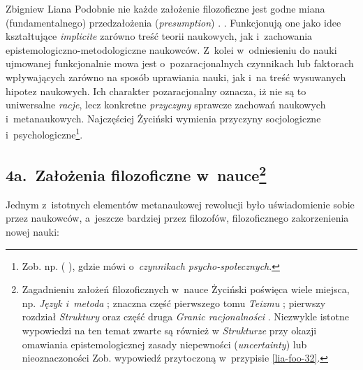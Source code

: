 \begin{artplenv}{Zbigniew Liana}
{%
Podobnie nie każde założenie filozoficzne jest godne miana (fundamentalnego) przedzałożenia
(\textit{presumption})
\parencites[s.~143]{zycinski_structure_1988}[s.~253]{zycinski_struktura_2013}.
}. Funkcjonują one jako idee
kształtujące \textit{implicite} zarówno treść teorii naukowych, jak i~zachowania epistemologiczno-metodologiczne
naukowców. Z~kolei w~odniesieniu do nauki ujmowanej funkcjonalnie mowa jest o~pozaracjonalnych czynnikach lub faktorach
wpływających zarówno na sposób uprawiania nauki, jak i~na treść wysuwanych hipotez naukowych. Ich charakter
pozaracjonalny oznacza, iż nie są to uniwersalne\textit{ racje}, lecz konkretne \textit{przyczyny} sprawcze zachowań
naukowych i~metanaukowych. Najczęściej Życiński wymienia przyczyny socjologiczne i~psychologiczne\footnote{Zob. np. 
(\cites[s.~142nn]{zycinski_jezyk_1983}[s.~9]{zycinski_structure_1988}[s.~17]{zycinski_struktura_2013}
\cite*[a~także][s.~190]{zycinski_elementy_1996}),
gdzie
mówi o~\textit{czynnikach psycho-społecznych}.}.

\subsection{4a.~Założenia filozoficzne w~nauce\footnote{Zagadnieniu założeń filozoficznych w~nauce Życiński poświęca wiele miejsca,
np. \textit{Język i~metoda}
\parencite*[s.~246–261]{zycinski_jezyk_1983};
znaczna część pierwszego tomu
\textit{Teizmu} \parencite[s.~156–232]{zycinski_teizm_1985};
pierwszy rozdział \textit{Struktury} oraz część druga
\textit{Granic racjonalności} \parencite{zycinski_granice_1993}.
Niezwykle istotne wypowiedzi na ten temat zwarte są również w
\textit{Strukturze} przy okazji omawiania epistemologicznej zasady niepewności (\textit{uncertainty}) lub nieoznaczoności
\parencites[s.~143n]{zycinski_structure_1988}[s.~254–256]{zycinski_struktura_2013}
Zob. wypowiedź przytoczoną w~przypisie \ref{lia-foo-32}.}}

Jednym z~istotnych elementów metanaukowej rewolucji było uświadomienie sobie przez naukowców, a~jeszcze bardziej przez
filozofów, filozoficznego zakorzenienia nowej nauki:


\end{artplenv}
